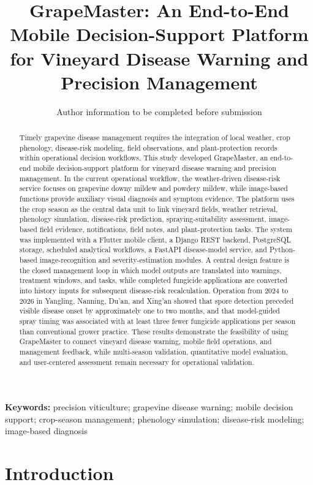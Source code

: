 \documentclass[11pt,a4paper]{article}
\title{GrapeMaster: An End-to-End Mobile Decision-Support Platform for Vineyard Disease Warning and Precision Management}
\author{Author information to be completed before submission}
\date{}
\begin{document}
\maketitle

\begin{abstract}
Timely grapevine disease management requires the integration of local weather, crop phenology, disease-risk modeling, field observations, and plant-protection records within operational decision workflows. This study developed GrapeMaster, an end-to-end mobile decision-support platform for vineyard disease warning and precision management. In the current operational workflow, the weather-driven disease-risk service focuses on grapevine downy mildew and powdery mildew, while image-based functions provide auxiliary visual diagnosis and symptom evidence. The platform uses the crop season as the central data unit to link vineyard fields, weather retrieval, phenology simulation, disease-risk prediction, spraying-suitability assessment, image-based field evidence, notifications, field notes, and plant-protection tasks. The system was implemented with a Flutter mobile client, a Django REST backend, PostgreSQL storage, scheduled analytical workflows, a FastAPI disease-model service, and Python-based image-recognition and severity-estimation modules. A central design feature is the closed management loop in which model outputs are translated into warnings, treatment windows, and tasks, while completed fungicide applications are converted into history inputs for subsequent disease-risk recalculation. Operation from 2024 to 2026 in Yangling, Nanning, Du'an, and Xing'an showed that spore detection preceded visible disease onset by approximately one to two months, and that model-guided spray timing was associated with at least three fewer fungicide applications per season than conventional grower practice. These results demonstrate the feasibility of using GrapeMaster to connect vineyard disease warning, mobile field operations, and management feedback, while multi-season validation, quantitative model evaluation, and user-centered assessment remain necessary for operational validation.
\end{abstract}

\textbf{Keywords:} precision viticulture; grapevine disease warning; mobile decision support; crop-season management; phenology simulation; disease-risk modeling; image-based diagnosis

\section{Introduction}
\end{document}

